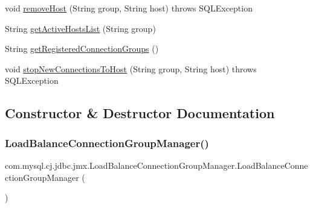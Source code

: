 \begin{DoxyCompactItemize}
\item 
void \mbox{\hyperlink{classcom_1_1mysql_1_1cj_1_1jdbc_1_1jmx_1_1_load_balance_connection_group_manager_ae28d9729a8c6bd064b97973376398d92}{remove\+Host}} (String group, String host)  throws S\+Q\+L\+Exception 
\item 
String \mbox{\hyperlink{classcom_1_1mysql_1_1cj_1_1jdbc_1_1jmx_1_1_load_balance_connection_group_manager_a0854bee1fbfa0efc6b1d53db7bc16ae3}{get\+Active\+Hosts\+List}} (String group)
\item 
String \mbox{\hyperlink{classcom_1_1mysql_1_1cj_1_1jdbc_1_1jmx_1_1_load_balance_connection_group_manager_ae388805fdc8aa6608edbf4f7d8e1c649}{get\+Registered\+Connection\+Groups}} ()
\item 
void \mbox{\hyperlink{classcom_1_1mysql_1_1cj_1_1jdbc_1_1jmx_1_1_load_balance_connection_group_manager_aded5d0e2efbd9f4a39e3347da772412a}{stop\+New\+Connections\+To\+Host}} (String group, String host)  throws S\+Q\+L\+Exception 
\end{DoxyCompactItemize}


\subsection{Constructor \& Destructor Documentation}
\mbox{\label{classcom_1_1mysql_1_1cj_1_1jdbc_1_1jmx_1_1_load_balance_connection_group_manager_aa6f5f267bc23e9ab0fd244dec525570a}} 
\subsubsection{\texorpdfstring{Load\+Balance\+Connection\+Group\+Manager()}{LoadBalanceConnectionGroupManager()}}
{\footnotesize\ttfamily com.\+mysql.\+cj.\+jdbc.\+jmx.\+Load\+Balance\+Connection\+Group\+Manager.\+Load\+Balance\+Connection\+Group\+Manager (\begin{DoxyParamCaption}{ }\end{DoxyParamCaption})}



